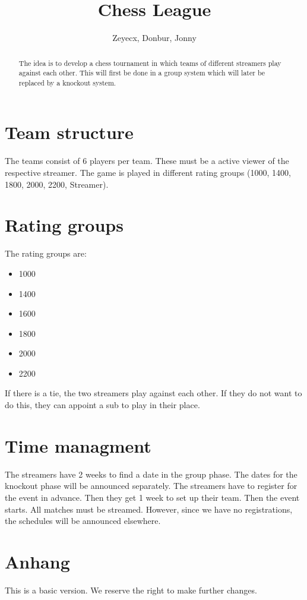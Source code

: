 \documentclass[preprint,12pt]{elsarticle}
\begin{document}
	
\begin{frontmatter}
			
\title{Chess League}
		
		
\author{Zeyecx, Donbur, Jonny}
		
\address{German Paper}
	 
\begin{abstract}
	The idea is to develop a chess tournament in which teams of different streamers play against each other.
	This will first be done in a group system which will later be replaced by a knockout system. 
\end{abstract}
\end{frontmatter}
\linenumbers
\section{Team structure}
The teams consist of 6 players per team. These must be a active viewer of the respective streamer. 
The game is played in different rating groups (1000, 1400, 1800, 2000, 2200, Streamer).

\section{Rating groups}

The rating groups are:
\begin{itemize}
	\item 1000
	\item 1400 
	\item 1600
	\item 1800
	\item 2000
	\item 2200
\end{itemize}
If there is a tie, the two streamers play against each other. If they do not want to do this, they can appoint a sub to play in their place.

\section{Time managment}
The streamers have 2 weeks to find a date in the group phase. The dates for the knockout phase will be announced separately.
The streamers have to register for the event in advance. Then they get 1 week to set up their team.
Then the event starts.
All matches must be streamed.
However, since we have no registrations, the schedules will be announced elsewhere.


\section{Anhang}
This is a basic version. We reserve the right to make further changes.




\end{document}

